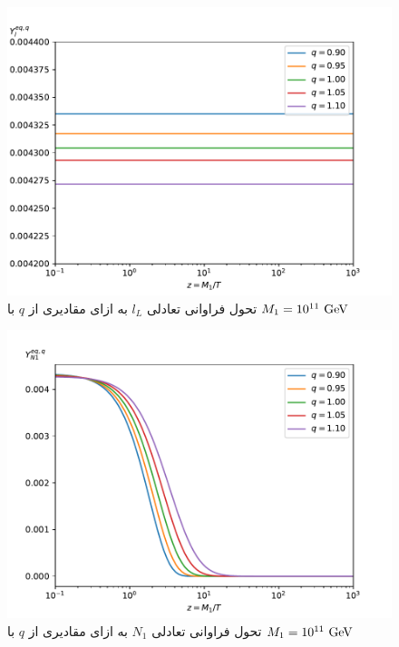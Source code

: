 \documentclass[a4paper]{book}
\begin{document}
\begin{figure}[!h]
	\centering
	\includegraphics[width=13cm]{fig-YEql-nonextensive.pdf}
	\caption{تحول فراوانی تعادلی {\footnotesize${l_L}$} به ازای مقادیری از {\footnotesize$q$} با {\footnotesize$M_1 = 10^{11}\ \rm GeV$} \label{fig:YEql-nonextensive}}
\end{figure}
\begin{figure}[!h]
	\centering
	\includegraphics[width=13cm]{fig-YEqN1-nonextensive.pdf}
	\caption{تحول فراوانی تعادلی {\footnotesize$N_1$} به ازای مقادیری از {\footnotesize$q$} با {\footnotesize$M_1 = 10^{11}\ \rm GeV$} \label{fig:YEqN1-nonextensive}}
\end{figure}
\end{document}
